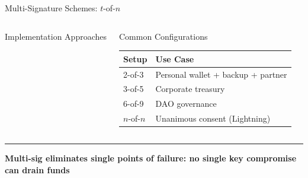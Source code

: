 \documentclass[8pt,aspectratio=169]{beamer}
\newcommand{\bottomnote}[1]{\vfill\vspace{-2mm}\textcolor{mllavender2}{\rule{\textwidth}{0.4pt}}\vspace{1mm}\footnotesize\textbf{#1}}
\begin{document}
\begin{frame}{Multi-Signature Schemes: $t$-of-$n$}
\begin{columns}
\begin{block}{Implementation Approaches}
\end{block}
\begin{block}{Common Configurations}
\scriptsize
\begin{tabular}{ll}
\toprule
\textbf{Setup} & \textbf{Use Case} \\
\midrule
2-of-3 & Personal wallet + backup + partner \\
3-of-5 & Corporate treasury \\
6-of-9 & DAO governance \\
$n$-of-$n$ & Unanimous consent (Lightning) \\
\bottomrule
\end{tabular}
\end{block}
\end{columns}
\bottomnote{Multi-sig eliminates single points of failure: no single key compromise can drain funds}
\end{frame}
\end{document}
